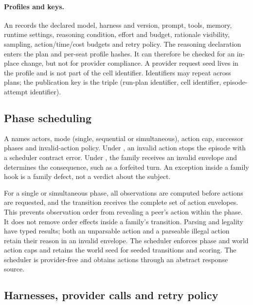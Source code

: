 \paragraph{Profiles and keys.}
An  records the declared model, harness and version,
prompt, tools, memory, runtime settings, reasoning condition, effort and
budget, rationale visibility, sampling, action/time/cost budgets and
retry policy. The reasoning declaration enters the plan and per-seat
profile hashes. It can therefore be checked for an in-place change,
but not for provider compliance. A provider request seed lives in the
profile and is not part of the cell identifier. Identifiers may repeat
across plans; the publication key is the triple (run-plan identifier,
cell identifier, episode-attempt identifier).

\subsection{Phase scheduling}
\label{app:runtime-phases}

A  names actors, mode (single, sequential or
simultaneous), action cap, successor phases and invalid-action policy.
Under , an invalid action stops the episode with a
scheduler contract error. Under , the family
receives an invalid envelope and determines the consequence, such as a
forfeited turn. An exception inside a family hook is a family defect,
not a verdict about the subject.

For a single or simultaneous phase, all observations are computed
before actions are requested, and the transition receives the complete
set of action envelopes. This prevents observation order from revealing
a peer's action within the phase. It does not remove order effects
inside a family's transition. Parsing and legality have typed results;
both an unparsable action and a parseable illegal action retain their
reason in an invalid envelope. The scheduler enforces phase and world
action caps and retains the world seed for seeded transitions and
scoring. The scheduler is provider-free and obtains actions through an
abstract response source.

\subsection{Harnesses, provider calls and retry policy}
\label{app:runtime-harness}

